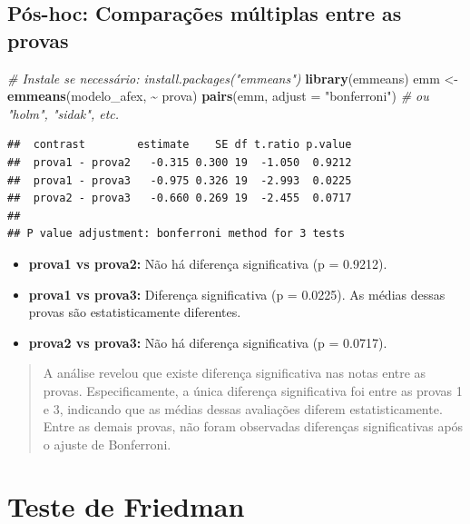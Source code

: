 \documentclass[
]{book}
\newenvironment{Shaded}{\begin{snugshade}}{\end{snugshade}}
\newcommand{\AttributeTok}[1]{\textcolor[rgb]{0.13,0.29,0.53}{#1}}
\newcommand{\CommentTok}[1]{\textcolor[rgb]{0.56,0.35,0.01}{\textit{#1}}}
\newcommand{\FunctionTok}[1]{\textcolor[rgb]{0.13,0.29,0.53}{\textbf{#1}}}
\newcommand{\NormalTok}[1]{#1}
\newcommand{\OtherTok}[1]{\textcolor[rgb]{0.56,0.35,0.01}{#1}}
\newcommand{\SpecialCharTok}[1]{\textcolor[rgb]{0.81,0.36,0.00}{\textbf{#1}}}
\newcommand{\StringTok}[1]{\textcolor[rgb]{0.31,0.60,0.02}{#1}}
\providecommand{\tightlist}{%
  \setlength{\itemsep}{0pt}\setlength{\parskip}{0pt}}
\begin{document}
\subsection{Pós-hoc: Comparações múltiplas entre as provas}\label{puxf3s-hoc-comparauxe7uxf5es-muxfaltiplas-entre-as-provas}

\begin{Shaded}
\begin{Highlighting}[]
\CommentTok{\# Instale se necessário: install.packages("emmeans")}
\FunctionTok{library}\NormalTok{(emmeans)}
\NormalTok{emm }\OtherTok{\textless{}{-}} \FunctionTok{emmeans}\NormalTok{(modelo\_afex, }\SpecialCharTok{\textasciitilde{}}\NormalTok{ prova)}
\FunctionTok{pairs}\NormalTok{(emm, }\AttributeTok{adjust =} \StringTok{"bonferroni"}\NormalTok{) }\CommentTok{\# ou "holm", "sidak", etc.}
\end{Highlighting}
\end{Shaded}

\begin{verbatim}
##  contrast        estimate    SE df t.ratio p.value
##  prova1 - prova2   -0.315 0.300 19  -1.050  0.9212
##  prova1 - prova3   -0.975 0.326 19  -2.993  0.0225
##  prova2 - prova3   -0.660 0.269 19  -2.455  0.0717
## 
## P value adjustment: bonferroni method for 3 tests
\end{verbatim}

\begin{itemize}
\tightlist
\item
  \textbf{prova1 vs prova2:} Não há diferença significativa (p = 0.9212).
\item
  \textbf{prova1 vs prova3:} Diferença significativa (p = 0.0225). As médias dessas provas são estatisticamente diferentes.
\item
  \textbf{prova2 vs prova3:} Não há diferença significativa (p = 0.0717).
\end{itemize}

\begin{quote}
A análise revelou que existe diferença significativa nas notas entre as provas. Especificamente, a única diferença significativa foi entre as provas 1 e 3, indicando que as médias dessas avaliações diferem estatisticamente. Entre as demais provas, não foram observadas diferenças significativas após o ajuste de Bonferroni.
\end{quote}

\section{Teste de Friedman}\label{teste-de-friedman}
\end{document}
